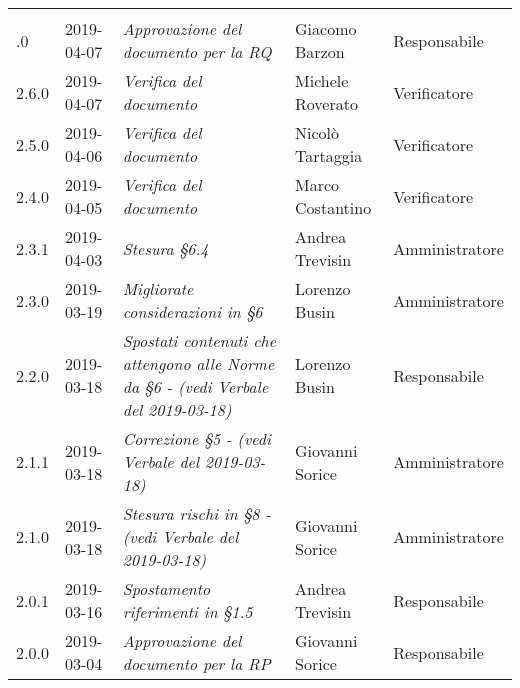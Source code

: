 \newpage
\section*{}
	\begin{longtable}{C{2cm}|C{2.5cm}|C{4.5cm}|C{2.5cm}|C{3cm}}

		 &  &  & &\\
		.0 & 2019-04-07 & \emph{Approvazione del documento per la RQ} & Giacomo Barzon & Responsabile \\
		\hline
		
		2.6.0 & 2019-04-07 & \emph{Verifica del documento} & Michele Roverato & Verificatore \\
		\hline
		
		2.5.0 & 2019-04-06 & \emph{Verifica del documento} & Nicolò Tartaggia & Verificatore \\
		\hline
		
		2.4.0 & 2019-04-05 & \emph{Verifica del documento} & Marco Costantino & Verificatore \\
		\hline
		
		2.3.1 & 2019-04-03 & \emph{Stesura §6.4} & Andrea Trevisin & Amministratore \\
		\hline
		
		2.3.0 & 2019-03-19 & \emph{Migliorate considerazioni in §6} & Lorenzo Busin & Amministratore \\
		\hline
		
		2.2.0 & 2019-03-18 & \emph{Spostati contenuti che attengono alle Norme da §6 - (vedi Verbale del 2019-03-18)} & Lorenzo Busin & Responsabile \\
		\hline
		
		2.1.1 & 2019-03-18 & \emph{Correzione §5 - (vedi Verbale del 2019-03-18)} & Giovanni Sorice & Amministratore \\
		\hline
		
		2.1.0 & 2019-03-18 & \emph{Stesura rischi in §8 - (vedi Verbale del 2019-03-18)} & Giovanni Sorice & Amministratore \\
		\hline
		
		2.0.1 & 2019-03-16 & \emph{Spostamento riferimenti in §1.5} & Andrea Trevisin & Responsabile \\
		\hline		

		2.0.0 & 2019-03-04 & \emph{Approvazione del documento per la RP} & Giovanni Sorice & Responsabile \\
		\hline


\end{longtable}

